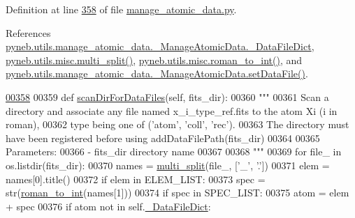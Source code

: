 Definition at line \hyperlink{manage__atomic__data_8py_source_l00358}{358} of file \hyperlink{manage__atomic__data_8py_source}{manage\-\_\-atomic\-\_\-data.\-py}.



References \hyperlink{manage__atomic__data_8py_source_l00078}{pyneb.\-utils.\-manage\-\_\-atomic\-\_\-data.\-\_\-\-Manage\-Atomic\-Data.\-\_\-\-Data\-File\-Dict}, \hyperlink{misc_8py_source_l00229}{pyneb.\-utils.\-misc.\-multi\-\_\-split()}, \hyperlink{misc_8py_source_l00095}{pyneb.\-utils.\-misc.\-roman\-\_\-to\-\_\-int()}, and \hyperlink{manage__atomic__data_8py_source_l00380}{pyneb.\-utils.\-manage\-\_\-atomic\-\_\-data.\-\_\-\-Manage\-Atomic\-Data.\-set\-Data\-File()}.


\begin{DoxyCode}
\hypertarget{classpyneb_1_1utils_1_1manage__atomic__data_1_1___manage_atomic_data_l00358}{}\hyperlink{classpyneb_1_1utils_1_1manage__atomic__data_1_1___manage_atomic_data_a065ac21e98ec49b6f9695c075dbde415}{00358} 
00359     \textcolor{keyword}{def }\hyperlink{classpyneb_1_1utils_1_1manage__atomic__data_1_1___manage_atomic_data_a065ac21e98ec49b6f9695c075dbde415}{scanDirForDataFiles}(self, fits\_dir):
00360         \textcolor{stringliteral}{"""}
00361 \textcolor{stringliteral}{        Scan a directory and associate any file named x\_i\_type\_ref.fits to the atom Xi (i in roman), }
00362 \textcolor{stringliteral}{        type being one of ('atom', 'coll', 'rec').}
00363 \textcolor{stringliteral}{        The directory must have been registered before using addDataFilePath(fits\_dir)}
00364 \textcolor{stringliteral}{}
00365 \textcolor{stringliteral}{        Parameters:}
00366 \textcolor{stringliteral}{            - fits\_dir        directory name}
00367 \textcolor{stringliteral}{}
00368 \textcolor{stringliteral}{        """}
00369         \textcolor{keywordflow}{for} file\_ \textcolor{keywordflow}{in} os.listdir(fits\_dir):
00370             names = \hyperlink{namespacepyneb_1_1utils_1_1misc_aa8d55231b0b2a1223bbd3acd3a1268e2}{multi\_split}(file\_, [\textcolor{stringliteral}{'\_'}, \textcolor{stringliteral}{'.'}])
00371             elem = names[0].title()            
00372             \textcolor{keywordflow}{if} elem \textcolor{keywordflow}{in} ELEM\_LIST:
00373                 spec = str(\hyperlink{namespacepyneb_1_1utils_1_1misc_ae67dbd6bb48d64216bc162ebdc25a183}{roman\_to\_int}(names[1]))
00374                 \textcolor{keywordflow}{if} spec \textcolor{keywordflow}{in} SPEC\_LIST:
00375                     atom = elem + spec
00376                     \textcolor{keywordflow}{if} atom \textcolor{keywordflow}{not} \textcolor{keywordflow}{in} self.\hyperlink{classpyneb_1_1utils_1_1manage__atomic__data_1_1___manage_atomic_data_a25a8e0770b6d8a375cfc9092d600684d}{\_DataFileDict}:

\end{DoxyCode}
